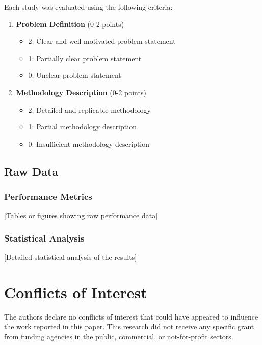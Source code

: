 Each study was evaluated using the following criteria:
\begin{enumerate}
    \item \textbf{Problem Definition} (0-2 points)
        \begin{itemize}
            \item 2: Clear and well-motivated problem statement
            \item 1: Partially clear problem statement
            \item 0: Unclear problem statement
        \end{itemize}
    \item \textbf{Methodology Description} (0-2 points)
        \begin{itemize}
            \item 2: Detailed and replicable methodology
            \item 1: Partial methodology description
            \item 0: Insufficient methodology description
        \end{itemize}
\end{enumerate}

\subsection{Raw Data}
\label{sec:raw_data}

\subsubsection{Performance Metrics}
[Tables or figures showing raw performance data]

\subsubsection{Statistical Analysis}
[Detailed statistical analysis of the results]

\section{Conflicts of Interest}
\label{sec:conflicts}

The authors declare no conflicts of interest that could have appeared to influence the work reported in this paper. This research did not receive any specific grant from funding agencies in the public, commercial, or not-for-profit sectors.

